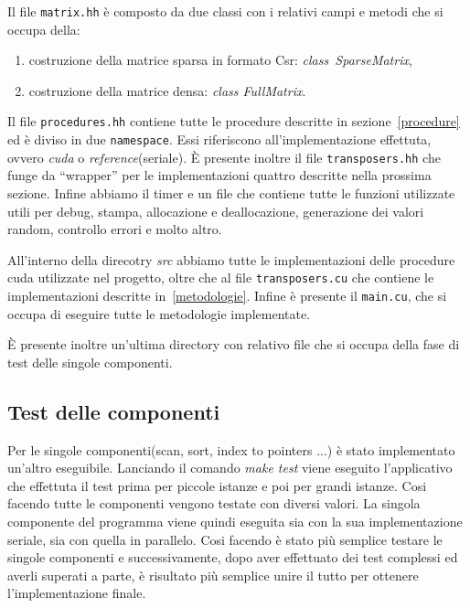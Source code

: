 \documentclass[]{IEEEtran}
\begin{document}
	Il file \texttt{matrix.hh} è composto da due classi con i relativi campi e metodi che si occupa della:
	\begin{enumerate}
		\item costruzione della matrice sparsa in formato Csr: \textit{class~SparseMatrix},
		\item costruzione della matrice densa: \textit{class FullMatrix}.
	\end{enumerate}
	Il file \texttt{procedures.hh} contiene tutte le procedure descritte in sezione~\ref{procedure} ed è diviso in due \texttt{namespace}. Essi riferiscono all'implementazione effettuta, ovvero \textit{cuda} o \textit{reference}(seriale).\newline
	È presente inoltre il file \texttt{transposers.hh} che funge da ``wrapper'' per le implementazioni quattro descritte nella prossima sezione.\newline
	Infine abbiamo il timer e un file che contiene tutte le funzioni utilizzate utili per debug, stampa, allocazione e deallocazione, generazione dei valori random, controllo errori e molto altro.\newline
	
	All'interno della direcotry \textit{src} abbiamo tutte le implementazioni delle procedure cuda utilizzate nel progetto, oltre che al file \texttt{transposers.cu} che contiene le implementazioni descritte in~\ref{metodologie}.\newline
	Infine è presente il \texttt{main.cu}, che si occupa di eseguire tutte le metodologie implementate.\newline

	È presente inoltre un'ultima directory con relativo file che si occupa della fase di test delle singole componenti.
	
	\subsection{Test delle componenti}	
	Per le singole componenti(scan, sort, index to pointers ...) è stato implementato un'altro eseguibile. Lanciando il comando \textit{make test} viene eseguito l'applicativo che effettuta il test prima per piccole istanze e poi per grandi istanze. Cosi facendo tutte le componenti vengono testate con diversi valori.\newline
	La singola componente del programma viene quindi eseguita sia con la sua implementazione seriale, sia con quella in parallelo. Cosi facendo è stato più semplice testare le singole componenti e successivamente, dopo aver effettuato dei test complessi ed averli superati a parte, è risultato più semplice unire il tutto per ottenere l'implementazione finale.
	
\end{document}
